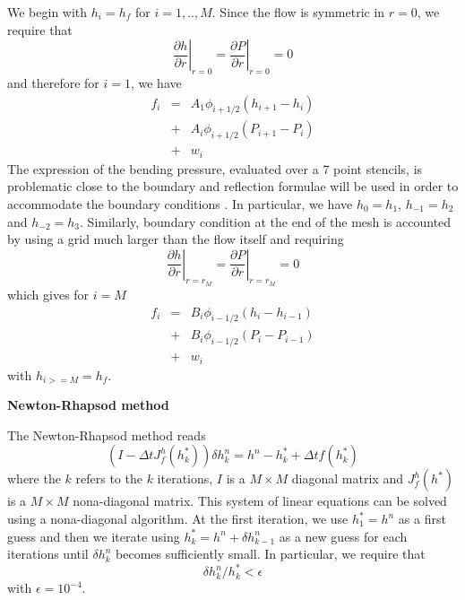  We begin with
$h_i=h_f$ for  $i=1,..,M$.  Since the  flow is symmetric in  $r=0$, we
require that
\begin{equation}
  \left.\frac{\partial h}{\partial r}\right|_{r=0} =\left.\frac{\partial P}{\partial r}\right|_{r=0} =0
\end{equation}
and therefore for $i=1$, we have
\begin{eqnarray}
  f_i     &=&A_1\phi_{i+1/2}\left(h_{i+1}-h_i\right)\nonumber\\
          &+&A_i\phi_{i+1/2}\left(P_{i+1}-P_i\right)\nonumber\\
          &+&w_i\label{C3-Num-5}
\end{eqnarray}
The expression  of the  bending pressure, evaluated  over a  $7$ point
stencils, is problematic close to the boundary and reflection formulae
will  be  used  in  order   to  accommodate  the  boundary  conditions
\citet{Patankar:1980vu}.   In   particular,  we  have  $h_0   =  h_1$,
$h_{-1}=h_2$ and  $h_{-2}=h_3$.  Similarly, boundary condition  at the
end of the mesh is accounted by using a grid much larger than the flow
itself and requiring
\begin{equation}
  \left.\frac{\partial h}{\partial r}\right|_{r=r_M} =\left.\frac{\partial P}{\partial r}\right|_{r=r_M} =0
\end{equation}
which gives for $i=M$
\begin{eqnarray}
  f_i     &=&B_i\phi_{i-1/2}\left(h_{i}-h_{i-1}\right)\nonumber\\
          &+&B_i\phi_{i-1/2}\left(P_{i}-P_{i-1}\right)\nonumber\\
          &+&w_i\label{C3-Num-5}
\end{eqnarray}
with $h_{i>=M}=h_f$.


\vspace{.5cm} \textbf{Newton-Rhapsod method} \vspace{.5cm}

The Newton-Rhapsod method reads
\begin{equation}
  (I-\Delta tJ^h_{f}(h_k^*))\delta h_k^n=h^n-h_k^*+\Delta t f(h_k^*)
\end{equation}
where the  $k$ refers  to the $k$  iterations, $I$ is  a $M  \times M$
diagonal  matrix and  $J_f^h(h^*)$  is a  $M  \times M$  nona-diagonal
matrix.  This  system  of  linear  equations can  be  solved  using  a
nona-diagonal algorithm. At the first  iteration, we use $h^*_1 = h^n$
as     a    first     guess    and     then    we     iterate    using
$h^*_k  = h^n+\delta  h_{k-1}^n$ as  a new  guess for  each iterations
until $\delta h^n_{k}$ becomes  sufficiently small.  In particular, we
require that
\begin{equation}
  \delta h^n_k/h^*_{k}<\epsilon
\end{equation}
with $\epsilon = 10^{-4}$. 

